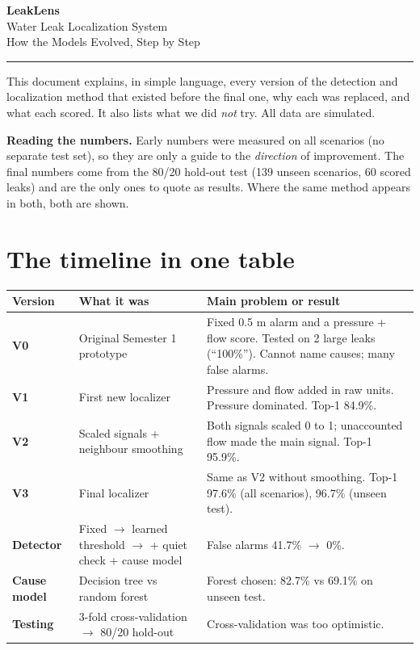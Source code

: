 \documentclass[11pt,a4paper]{article}
\begin{document}
\begin{center}
{\Huge\bfseries\color{navy} LeakLens}\\[3pt]{\large Water Leak Localization System}\\[8pt]
{\LARGE How the Models Evolved, Step by Step}\end{center}
\hrule\vspace{3mm}

This document explains, in simple language, every version of the detection and localization method that existed before the final one, why each was replaced, and what each scored. It also lists what we did \emph{not} try. All data are simulated.

\begin{note}
\textbf{Reading the numbers.} Early numbers were measured on all scenarios (no separate test set), so they are only a guide to the \emph{direction} of improvement. The final numbers come from the 80/20 hold-out test (139 unseen scenarios, 60 scored leaks) and are the only ones to quote as results. Where the same method appears in both, both are shown.
\end{note}

\section{The timeline in one table}
\begin{center}\small\begin{tabularx}{\linewidth}{@{}>{\bfseries}p{1.5cm}p{3.4cm}Y@{}}\toprule
Version & What it was & Main problem or result \\\midrule
V0 & Original Semester 1 prototype & Fixed 0.5 m alarm and a pressure + flow score. Tested on 2 large leaks (``100\%''). Cannot name causes; many false alarms. \\
V1 & First new localizer & Pressure and flow added in raw units. Pressure dominated. Top-1 84.9\%. \\
V2 & Scaled signals + neighbour smoothing & Both signals scaled 0 to 1; unaccounted flow made the main signal. Top-1 95.9\%. \\
V3 & Final localizer & Same as V2 without smoothing. Top-1 97.6\% (all scenarios), 96.7\% (unseen test). \\
Detector & Fixed $\to$ learned threshold $\to$ + quiet check + cause model & False alarms 41.7\% $\to$ 0\%. \\
Cause model & Decision tree vs random forest & Forest chosen: 82.7\% vs 69.1\% on unseen test. \\
Testing & 3-fold cross-validation $\to$ 80/20 hold-out & Cross-validation was too optimistic. \\\bottomrule\end{tabularx}\end{center}
\end{document}
